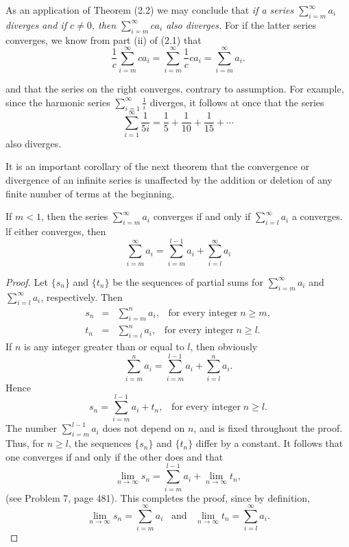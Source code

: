 As an application of Theorem (2.2) we may conclude that \textit{if a series $\sum_{i=m}^\infty a_i$ diverges and if $c \neq 0$, then $\sum_{i=m}^\infty ca_i$ also diverges.} For if the latter series converges, we know from part (ii) of (2.1) that
$$
\frac{1}{c} \sum_{i=m}^\infty ca_i = \sum_{i=m}^\infty \frac{1}{c} ca_i = \sum_{i=m}^\infty a_i.
$$

\noindent and that the series on the right converges, contrary to assumption. For example, since the harmonic series $\sum_{i=1}^\infty \frac{1}{i}$ diverges, it follows at once that the series   
$$
\sum_{i=1}^\infty \frac{1}{5i} = \frac{1}{5} + \frac{1}{10} + \frac{1}{15} + \cdots
$$
\noindent also diverges.

It is an important corollary of the next theorem that the convergence or divergence of an infinite series is unaffected by the addition or deletion of any finite number of terms at the beginning.

\begin{theorem} %
If $m < 1$, then the series $\sum_{i=m}^\infty a_i$ converges if and only if $\sum_{i=l}^\infty a_i$ a converges. lf either converges, then
$$
\sum_{i=m}^\infty a_i = \sum_{i=m}^{l-1} a_i + \sum_{i=l}^\infty a_i
$$
\end{theorem}


\begin{proof}
Let $\{ s_n \}$ and $\{ t_n \}$ be the sequences of partial sums for $\sum_{i=m}^\infty a_i$ and $\sum_{i=l}^\infty a_i$, respectively. Then
\begin{eqnarray*}
s_n &=& \sum_{i=m}^n a_i, \;\;\;\mbox{for every integer}\; n \geq m,\\
t_n  &=& \sum_{i=l}^n a_i,    \;\;\;\mbox{for every integer}\; n \geq l.
\end{eqnarray*}
If $n$ is any integer greater than or equal to $l$, then obviously 
$$
\sum_{i=m}^n a_i = \sum_{i=m}^{l-1} a_i + \sum_{i=l}^n a_i.
$$
Hence
$$
s_n = \sum_{i=m}^{l-1} a_i + t_n, \;\;\;\mbox{for every integer}\; n \geq l.
$$
The number $\sum_{i=m}^{l-1} a_i$ does not depend on $n$, and is fixed throughout the proof. Thus, for $n \geq l$, the sequences $\{ s_n \}$ and $\{ t_n \}$ differ by a constant. It follows that one converges if and only if the other does and that
$$
\lim_{n \rightarrow \infty} s_n = \sum_{i=m}^{l-1} a_i + \lim_{n \rightarrow \infty} t_n,
$$
(see Problem 7, page 481). This completes the proof, since by definition,
$$
\lim_{n \rightarrow \infty} s_n = \sum_{i=m}^\infty a_i \;\;\;\mbox{and}\;\;\; \lim_{n \rightarrow \infty} t_n = \sum_{i=l}^\infty a_i .
$$
\end{proof}

